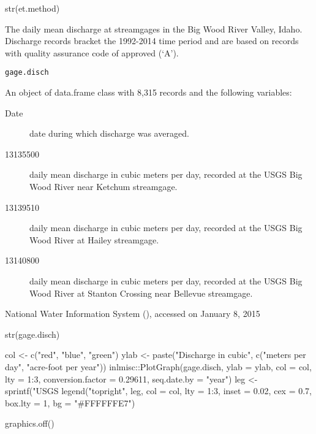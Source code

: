 \documentclass[a4paper]{book}
\begin{document}
%
\begin{Examples}
\begin{ExampleCode}
str(et.method)

\end{ExampleCode}
\end{Examples}
%
\begin{Description}\relax
The daily mean discharge at streamgages in the Big Wood River Valley, Idaho.
Discharge records bracket the 1992-2014 time period and are based on
records with quality assurance code of approved (`A').
\end{Description}
%
\begin{Usage}
\begin{verbatim}
gage.disch
\end{verbatim}
\end{Usage}
%
\begin{Format}
An object of data.frame class with 8,315 records and the following variables:
\begin{description}

\item[Date] date during which discharge was averaged.
\item[13135500] daily mean discharge in cubic meters per day, recorded at the USGS
Big Wood River near Ketchum streamgage.
\item[13139510] daily mean discharge in cubic meters per day, recorded at the USGS
Big Wood River at Hailey streamgage.
\item[13140800] daily mean discharge in cubic meters per day, recorded at the USGS
Big Wood River at Stanton Crossing near Bellevue streamgage.

\end{description}

\end{Format}
%
\begin{Source}\relax
National Water Information System (),
accessed on January 8, 2015
\end{Source}
%
\begin{Examples}
\begin{ExampleCode}
str(gage.disch)

col <- c("red", "blue", "green")
ylab <- paste("Discharge in cubic", c("meters per day", "acre-foot per year"))
inlmisc::PlotGraph(gage.disch, ylab = ylab, col = col, lty = 1:3,
                   conversion.factor = 0.29611, seq.date.by = "year")
leg <- sprintf("USGS %
legend("topright", leg, col = col, lty = 1:3, inset = 0.02, cex = 0.7,
       box.lty = 1, bg = "#FFFFFFE7")

graphics.off()

\end{ExampleCode}
\end{Examples}
\end{document}
